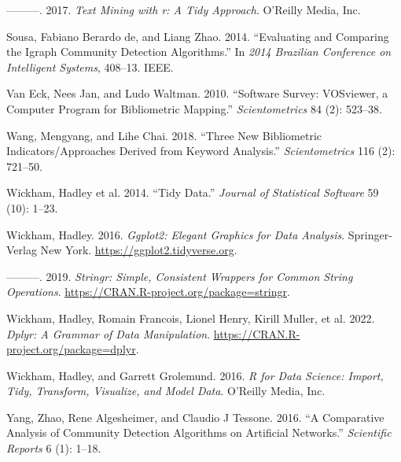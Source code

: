 \begin{CSLReferences}{1}{0}
\leavevmode{}%
---------. 2017. \emph{Text Mining with r: A Tidy Approach}. O'Reilly Media, Inc.

\leavevmode{}%
Sousa, Fabiano Berardo de, and Liang Zhao. 2014. {``Evaluating and Comparing the Igraph Community Detection Algorithms.''} In \emph{2014 Brazilian Conference on Intelligent Systems}, 408--13. IEEE.

\leavevmode{}%
Van Eck, Nees Jan, and Ludo Waltman. 2010. {``Software Survey: VOSviewer, a Computer Program for Bibliometric Mapping.''} \emph{Scientometrics} 84 (2): 523--38.

\leavevmode{}%
Wang, Mengyang, and Lihe Chai. 2018. {``Three New Bibliometric Indicators/Approaches Derived from Keyword Analysis.''} \emph{Scientometrics} 116 (2): 721--50.

\leavevmode{}%
Wickham, Hadley et al. 2014. {``Tidy Data.''} \emph{Journal of Statistical Software} 59 (10): 1--23.

\leavevmode{}%
Wickham, Hadley. 2016. \emph{Ggplot2: Elegant Graphics for Data Analysis}. Springer-Verlag New York. \url{https://ggplot2.tidyverse.org}.

\leavevmode{}%
---------. 2019. \emph{Stringr: Simple, Consistent Wrappers for Common String Operations}. \url{https://CRAN.R-project.org/package=stringr}.

\leavevmode{}%
Wickham, Hadley, Romain Francois, Lionel Henry, Kirill Muller, et al. 2022. \emph{Dplyr: A Grammar of Data Manipulation}. \url{https://CRAN.R-project.org/package=dplyr}.

\leavevmode{}%
Wickham, Hadley, and Garrett Grolemund. 2016. \emph{R for Data Science: Import, Tidy, Transform, Visualize, and Model Data}. O'Reilly Media, Inc.

\leavevmode{}%
Yang, Zhao, Rene Algesheimer, and Claudio J Tessone. 2016. {``A Comparative Analysis of Community Detection Algorithms on Artificial Networks.''} \emph{Scientific Reports} 6 (1): 1--18.

\end{CSLReferences}

